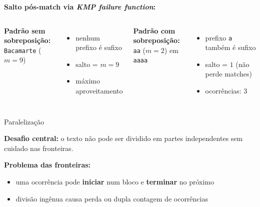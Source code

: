 \documentclass{beamer}
\begin{document}
\begin{frame}
\textbf{Salto pós-match via \textit{KMP failure function}:}

\begin{columns}
    \textbf{Padrão sem sobreposição:}\\
    \texttt{Bacamarte} ($m = 9$)
    \begin{itemize}
        \item nenhum prefixo é sufixo
        \item salto = $m = 9$
        \item máximo aproveitamento
    \end{itemize}

    \textbf{Padrão com sobreposição:}\\
    \texttt{aa} ($m = 2$) em \texttt{aaaa}
    \begin{itemize}
        \item prefixo \texttt{a} também é sufixo
        \item salto = $1$ (não perde matches)
        \item ocorrências: 3
    \end{itemize}
\end{columns}



\end{frame}


\begin{frame}{Paralelização}

\textbf{Desafio central:} o texto não pode ser dividido em partes
independentes sem cuidado nas fronteiras.

\vspace{0.2cm}

\textbf{Problema das fronteiras:}
\begin{itemize}
    \item uma ocorrência pode \textbf{iniciar} num bloco e \textbf{terminar} no próximo
    \item divisão ingênua causa perda ou dupla contagem de ocorrências
\end{itemize}

\vspace{0.2cm}

\end{frame}
\end{document}
